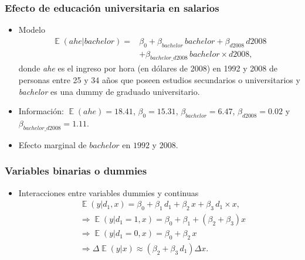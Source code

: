 \documentclass[t, compress, spanish, aspectratio=169]{beamer}
\DeclareMathOperator{\E}{\mathbb{E}}
\begin{document}
    \begin{frame}
    		\frametitle{Efecto de educaci\'on universitaria en salarios}
    		\begin{itemize}
    			\item  Modelo
    			\begin{align*}
    				\E(ahe|bachelor) =& \beta_0 +\beta_{bachelor} \,bachelor +\beta_{d2008} \,d2008\\
    				&+\beta_{bachelor\_d2008} \,bachelor \times d2008,
    			\end{align*}
    			donde \emph{ahe} es el ingreso por hora (en d\'olares de 2008) en 1992 y 2008 de personas entre 25 y 34 a\~nos que poseen estudios secundarios o universitarios y \emph{bachelor} es una dummy de graduado universitario.
    			\item Informaci\'on: $\E(ahe)=18.41$, $\beta_{0}=15.31$, $\beta_{bachelor}=6.47$, $\beta_{d2008}=0.02$ y $\beta_{bachelor\_d2008}=1.11$.
    			\item Efecto marginal de $bachelor$ en $1992$ y $2008$.
   	 	\end{itemize}
    \end{frame}
    
    \begin{frame}
        \frametitle{Variables binarias o dummies}
        \begin{itemize}
            \item Interacciones entre variables dummies y continuas
            \begin{align*}
            		&\E(y|d_1, x)=\beta_0 + \beta_1 \, d_1+\beta_2 \, x+\beta_3 \, d_1 \times x, \\
            		&\Rightarrow \E(y|d_1\!=\!1,x)=\beta_0+\beta_1 + (\beta_2+\beta_3)x\\
            		&\Rightarrow \E(y|d_1\!=\!0,x)= \beta_0+ \beta_2 \, x\\                
                &\Rightarrow \Delta \E(y|x) \approx (\beta_2+\beta_3\,d_1)  \Delta x.
            \end{align*}
        \end{itemize}
    \end{frame}
\end{document}
